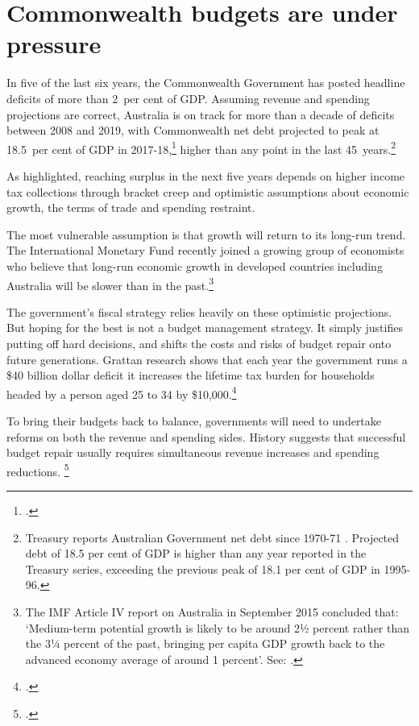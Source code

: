 \chapter{Commonwealth budgets are under pressure}
In five of the last six years, the Commonwealth Government has posted headline deficits of more than 2~per cent of GDP.
Assuming revenue and spending projections are correct, Australia is on track for more than a decade of deficits between 2008 and 2019, with Commonwealth net debt projected to peak at 18.5~per cent of GDP in 2017-18,\footcite[][1]{Treasury2015MYEFO201516} higher than any point in the last 45~years.\footnote{Treasury reports Australian Government net debt since 1970-71 \textcite[273]{Treasury2014-MYEFO-2014-15}. Projected debt of 18.5 per cent of GDP is higher than any year reported in the Treasury series, exceeding the previous peak of 18.1 per cent of GDP in 1995-96.}
 
As  highlighted, reaching surplus in the next five years depends on higher income tax collections through bracket creep and optimistic assumptions about economic growth, the terms of trade and spending restraint.
 
The most vulnerable assumption is that growth will return to its long-run trend. The International Monetary Fund recently joined a growing group of economists who believe that long-run economic growth in developed countries including Australia will be slower than in the past.\footnote{The IMF Article IV report on Australia in September 2015 concluded that: ‘Medium-term potential growth is likely to be around 2½ percent rather than the 3¼ percent of the past, bringing per capita GDP growth back to the advanced economy average of around 1 percent’. See: \textcite[][11]{IMF2015b}.}
 
 
The government’s fiscal strategy relies heavily on these optimistic projections. But hoping for the best is not a budget management strategy. It simply justifies putting off hard decisions, and shifts the costs and risks of budget repair onto future generations. Grattan research shows that each year the government runs a \$40 billion dollar deficit it increases the lifetime tax burden for households headed by a person aged 25 to 34 by \$10,000.\footcite[][9]{DaleyWoodWeidmannEtAl2014}
 
To bring their budgets back to balance, governments will need to undertake reforms on both the revenue and spending sides. History suggests that successful budget repair usually requires simultaneous revenue increases and spending reductions. \footcite[][16]{Daley2013}
 
